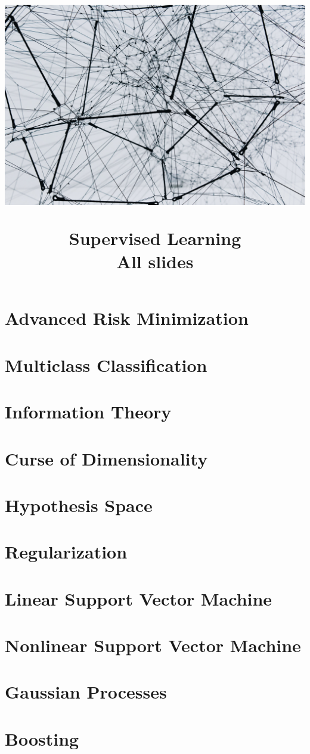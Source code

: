 \documentclass[11pt,compress]{beamer}
\title{
  \hspace{-0.5cm}\centerline{\includegraphics[width=1.05\paperwidth,keepaspectratio, trim={0 15cm 0 5cm}, clip]{titlepage.jpg}}
  \medskip
  Supervised Learning \\
  \medskip
  \small All slides
  \vspace{-1.5cm}
}
\begin{document}

\begin{frame}
\maketitle
\end{frame}



\section{Advanced Risk Minimization}


\section{Multiclass Classification}


\section{Information Theory}


\section{Curse of Dimensionality}


\section{Hypothesis Space}


\section{Regularization}


\section{Linear Support Vector Machine}


\section{Nonlinear Support Vector Machine}


\section{Gaussian Processes}


\section{Boosting}

\end{document}
